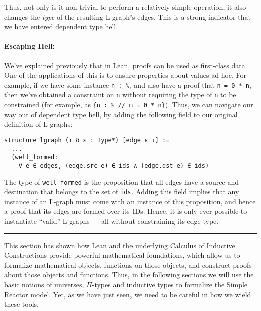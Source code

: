 \noindent Thus, not only is it non-trivial to perform a relatively simple operation, it also changes the \emph{type} of the resulting L-graph's edges.
This is a strong indicator that we have entered dependent type hell.

\paragraph{Escaping Hell:}

We've explained previously that in Lean, proofs can be used as first-class data.
One of the applications of this is to ensure properties about values ad hoc.
For example, if we have some instance \lstinline{n : ℕ}, and also have a proof that \lstinline{n = 0 * n}, then we've obtained a constraint on \lstinline{n} without requiring the type of \lstinline{n} to be constrained (for example, as \lstinline|{n : ℕ // n = 0 * n}|).
Thus, we can navigate our way out of dependent type hell, by adding the following field to our original definition of L-graphs:

\begin{lstlisting}
structure lgraph (ι δ ε : Type*) [edge ε ι] := 
  ...
  (well_formed: 
    ∀ e ∈ edges, (edge.src e) ∈ ids ∧ (edge.dst e) ∈ ids)
\end{lstlisting}

\noindent The type of \lstinline{well_formed} is the proposition that all edges have a source and destination that belongs to the set of \lstinline{ids}.
Adding this field implies that any instance of an L-graph must come with an instance of this proposition, and hence a proof that its edges are formed over its IDs. 
Hence, it is only ever possible to instantiate ``valid'' L-graphs --- all without constraining its edge type.

\vspace{5mm}
\hrule
\vspace{5mm}

\noindent This section has shown how Lean and the underlying Calculus of Inductive Constructions provide powerful mathematical foundations, which allow us to formalize mathematical objects, functions on those objects, and construct proofs about those objects and functions.
Thus, in the following sections we will use the basic notions of universes, $\Pi$-types and inductive types to formalize the Simple Reactor model.
Yet, as we have just seen, we need to be careful in how we wield these tools.
